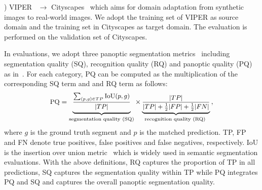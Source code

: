 \documentclass[10pt,twocolumn,letterpaper]{article}
\begin{document}
) VIPER~\cite{richter2017viper} $\rightarrow$ Cityscapes~\cite{cordts2016cityscapes} which aims for domain adaptation from synthetic images to real-world images. We adopt the training set of VIPER as source domain and the training set in Cityscapes as target domain. The evaluation is performed on the validation set of Cityscapes.

In evaluations, we adopt three panoptic segmentation metrics~\cite{kirillov2019panoptic} including segmentation quality (SQ), recognition quality (RQ) and panoptic quality (PQ) as in~\cite{kirillov2019panoptic,kirillov2019panopticfpn,li2021fullypanoptic,huang2021cvrn}. For each category, 
PQ can be computed as the multiplication of the corresponding SQ term and and RQ term as follows:
\begin{equation}
\label{pq}
 \small{\text{PQ}} = \underbrace{\frac{\sum_{(p, g) \in TP} \text{IoU}(p, g)}{\vphantom{\frac{1}{2}}|TP|}}_{\text{segmentation quality (SQ)}} \times \underbrace{\frac{|TP|}{|TP| + \frac{1}{2} |FP| + \frac{1}{2} |FN|}}_{\text{recognition quality (RQ) }} \,,
\end{equation}
where $g$ is the ground truth segment and $p$ is the matched prediction. TP, FP and FN denote true positives, false positives and false negatives, respectively. IoU is the insertion over union metric~\cite{everingham2015pascal} which is widely used in semantic segmentation evaluations. With the above definitions, RQ captures the proportion of TP in all predictions, SQ captures the segmentation quality within TP while PQ integrates PQ and SQ and captures the overall panoptic segmentation quality.
\end{document}

